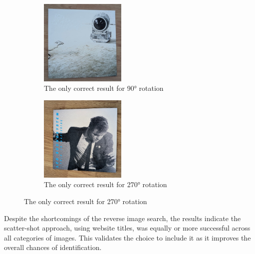 \begin{figure} [H]
    \captionsetup{justification=centering}
    \centering
    \begin{subfigure}[t]{0.45\textwidth}
        \centering
        \includegraphics[width=0.45\textwidth]{figures/test_albums/Sound_Of_Silver_Rotated - 90.jpg}
        \caption{The only correct result for 90° rotation}
        \label{fig:sos_rotated_90}
    \end{subfigure}
    \begin{subfigure}[t]{0.45\textwidth}
        \centering
        \includegraphics[width=0.45\textwidth]{figures/test_albums/This_Is_Happening_Rotated - 270.jpg}
        \caption{The only correct result for 270° rotation}
        \label{fig:tih_rotated_270}
    \end{subfigure}
\end{figure}

Despite the shortcomings of the reverse image search, the results indicate the scatter-shot approach, using website titles, was equally or more successful across all categories of images. This validates the choice to include it as it improves the overall chances of identification.

